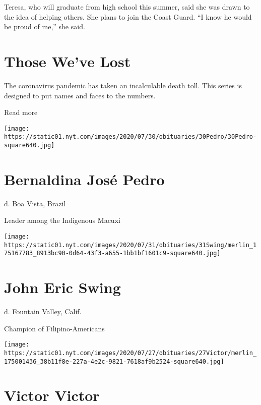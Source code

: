 Teresa, who will graduate from high school this summer, said she was
drawn to the idea of helping others. She plans to join the Coast Guard.
``I know he would be proud of me,'' she said.

\href{https://www.nytimes.com/interactive/2020/obituaries/people-died-coronavirus-obituaries.html?action=click\&pgtype=Article\&state=default\&region=BELOW_MAIN_CONTENT\&context=covid_obits_promo}{}

\hypertarget{those-weve-lost}{%
\section{Those We've Lost}\label{those-weve-lost}}

The coronavirus pandemic has taken an incalculable death toll. This
series is designed to put names and faces to the numbers.

Read more

\texttt{[image: https://static01.nyt.com/images/2020/07/30/obituaries/30Pedro/30Pedro-square640.jpg]}

\hypertarget{bernaldina-josuxe9-pedro}{%
\section{Bernaldina José Pedro}\label{bernaldina-josuxe9-pedro}}

d. Boa Vista, Brazil

Leader among the Indigenous Macuxi

\texttt{[image: https://static01.nyt.com/images/2020/07/31/obituaries/31Swing/merlin\_175167783\_8913bc90-0d64-43f3-a655-1bb1bf1601c9-square640.jpg]}

\hypertarget{john-eric-swing}{%
\section{John Eric Swing}\label{john-eric-swing}}

d. Fountain Valley, Calif.

Champion of Filipino-Americans

\texttt{[image: https://static01.nyt.com/images/2020/07/27/obituaries/27Victor/merlin\_175001436\_38b11f8e-227a-4e2c-9821-7618af9b2524-square640.jpg]}

\hypertarget{victor-victor}{%
\section{Victor Victor}\label{victor-victor}}

